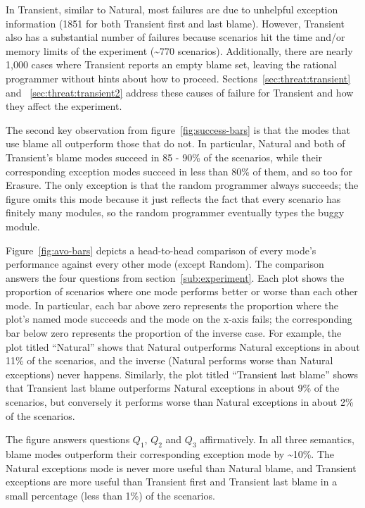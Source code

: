 In Transient, similar to Natural, most failures are due to unhelpful exception
information (1851 for both Transient first and last blame).  However, Transient
also has a substantial number of failures because scenarios hit the time and/or
memory limits of the experiment (\textasciitilde770 scenarios).  Additionally,
there are nearly 1,000 cases where Transient reports an empty blame set, leaving
the rational programmer without hints about how to proceed.
Sections~\ref{sec:threat:transient} and ~\ref{sec:threat:transient2} address
these causes of failure for Transient and how they affect the experiment.

The second key observation from figure~\ref{fig:success-bars} is that the modes
that use blame all outperform those that do not. In particular, Natural and both
of Transient's blame modes succeed in 85 - 90\% of the scenarios, while their
corresponding exception modes succeed in less than 80\% of them, and so too for
Erasure. The only exception is that the random programmer always succeeds; the
figure omits this mode because it just reflects the fact that every scenario has
finitely many modules, so the random programmer eventually types the buggy
module.

Figure~\ref{fig:avo-bars} depicts a head-to-head comparison of every
mode's performance against every other mode (except Random). The
comparison  answers the four questions from section~\ref{sub:experiment}. 
Each plot shows the proportion of scenarios where one mode performs
better or worse than each other mode.  In particular, each bar above zero
represents the proportion where the plot's named mode succeeds and the
mode on the x-axis fails; the corresponding bar below zero represents the
proportion of the inverse case.  For example, the plot titled ``Natural''
shows that Natural outperforms Natural exceptions in about 11\% of the
scenarios, and the inverse (Natural performs worse than Natural
exceptions) never happens.  Similarly, the plot titled ``Transient last
blame'' shows that Transient last blame outperforms Natural exceptions
 in about 9\% of the scenarios, but conversely it performs worse
than Natural exceptions in about 2\% of the scenarios.

The figure answers questions $Q_1$, $Q_2$ and $Q_3$ affirmatively.  
In all three semantics, blame modes outperform their
corresponding exception mode by \textasciitilde10\%.  The
Natural exceptions mode is never more useful than Natural blame, and
Transient exceptions are more useful than Transient first and Transient
last blame in a small percentage (less than 1\%) of the scenarios. 

